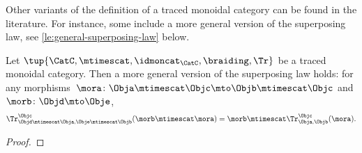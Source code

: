 \begin{remark}
Other variants of the definition of a traced monoidal category can be found in the literature. For instance, some include a more general version of the superposing law, see \cref{le:general-superposing-law} below. 
\end{remark}

\begin{lemma}\label{le:general-superposing-law}
Let $\tup{\CatC,\mtimescat,\idmoncat_{\CatC}, \braiding, \Tr}$ be a traced monoidal category. Then a more general version 
of the superposing law holds: for any morphisms~$\mora\colon \Obja\mtimescat \Objc \mto \Objb \mtimescat \Objc$ and $\morb \colon \Objd \mto \Obje$, 
\begin{equation}
            \label{eq:superposing}
            \Tr_{\Objd\mtimescat \Obja,\Obje\mtimescat \Objb}^{\Objc}(\morb \mtimescat \mora)=\morb \mtimescat \Tr_{\Obja,\Objb}^\Objc(\mora).
        \end{equation}
\end{lemma}

\begin{proof}
\end{proof}
